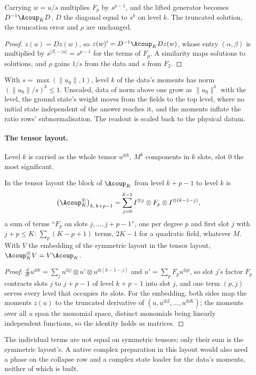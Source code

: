 \begin{proposition}
\label{prop:level-scale}
Carrying $w=u/s$ multiplies $F_p$ by $s^{p-1}$, and the lifted generator becomes $D^{-1}\Acoup_KD$, $D$ the diagonal equal to $s^k$ on level $k$. The truncated solution, the truncation error and $\rho$ are unchanged.
\end{proposition}
\begin{proof}
$z(u)=Dz(w)$, so $z(w)'=D^{-1}\Acoup_KDz(w)$, whose entry $(\alpha,\beta)$ is multiplied by $s^{|\beta|-|\alpha|}=s^{p-1}$ for the terms of $F_p$. A similarity maps solutions to solutions, and $\rho$ gains $1/s$ from the data and $s$ from $F_2$.
\end{proof}
With $s=\max(\|u_0\|,1)$, level $k$ of the data's moments has norm $(\|u_0\|/s)^k\le1$. Unscaled, data of norm above one grow as $\|u_0\|^k$ with the level, the ground state's weight moves from the fields to the top level, where no initial state independent of the answer reaches it, and the moments inflate the ratio rows' subnormalisation. The readout is scaled back to the physical datum.

\paragraph{The tensor layout.} Level $k$ is carried as the whole tensor $u^{\otimes k}$, $M^k$ components in $k$ slots, slot $0$ the most significant.

\begin{proposition}
\label{prop:tensor-terms}
In the tensor layout the block of $\Acoup_K$ from level $k+p-1$ to level $k$ is
\begin{equation}
    \bigl(\Acoup^{\otimes}_K\bigr)_{k,\,k+p-1}=\sum_{j=0}^{k-1}I^{\otimes j}\otimes F_p\otimes I^{\otimes(k-1-j)},
\end{equation}
a sum of terms ``$F_p$ on slots $j,\dots,j+p-1$'', one per degree $p$ and first slot $j$ with $j+p\le K$: $\sum_p(K-p+1)$ terms, $2K-1$ for a quadratic field, whatever $M$. With $V$ the embedding of the symmetric layout in the tensor layout, $\Acoup^\otimes_KV=V\Acoup_K$.
\end{proposition}
\begin{proof}
$\frac{d}{dt}u^{\otimes k}=\sum_ju^{\otimes j}\otimes u'\otimes u^{\otimes(k-1-j)}$ and $u'=\sum_pF_pu^{\otimes p}$, so slot $j$'s factor $F_p$ contracts slots $j$ to $j+p-1$ of level $k+p-1$ into slot $j$, and one term $(p,j)$ serves every level that occupies its slots. For the embedding, both sides map the moments $z(u)$ to the truncated derivative of $(u,u^{\otimes2},\dots,u^{\otimes K})$; the moments over all $u$ span the monomial space, distinct monomials being linearly independent functions, so the identity holds as matrices.
\end{proof}
The individual terms are not equal on symmetric tensors; only their sum is the symmetric layout's. A native complex preparation in this layout would also need a phase on the collapse row and a complex state loader for the data's moments, neither of which is built.

